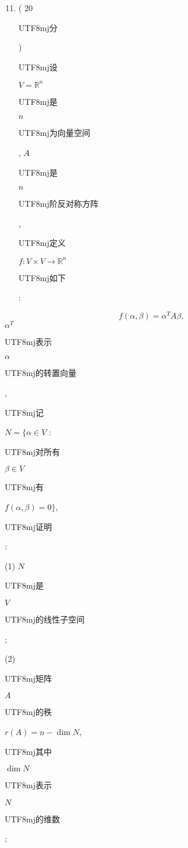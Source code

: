 \documentclass[10pt]{article}
\begin{document}
\begin{enumerate}
  \setcounter{enumi}{10}
  \item ( 20 \begin{CJK}{UTF8}{mj}分\end{CJK}) \begin{CJK}{UTF8}{mj}设\end{CJK} $V=\mathbb{R}^{n}$ \begin{CJK}{UTF8}{mj}是\end{CJK} $n$ \begin{CJK}{UTF8}{mj}为向量空间\end{CJK}, $A$ \begin{CJK}{UTF8}{mj}是\end{CJK} $n$ \begin{CJK}{UTF8}{mj}阶反对称方阵\end{CJK}, \begin{CJK}{UTF8}{mj}定义\end{CJK} $f: V \times V \rightarrow \mathbb{R}^{n}$ \begin{CJK}{UTF8}{mj}如下\end{CJK}:
\end{enumerate}
$$
f(\alpha, \beta)=\alpha^{T} A \beta,
$$
$\alpha^{T}$ \begin{CJK}{UTF8}{mj}表示\end{CJK} $\alpha$ \begin{CJK}{UTF8}{mj}的转置向量\end{CJK}, \begin{CJK}{UTF8}{mj}记\end{CJK} $N=\{\alpha \in V$ : \begin{CJK}{UTF8}{mj}对所有\end{CJK} $\beta \in V$ \begin{CJK}{UTF8}{mj}有\end{CJK} $f(\alpha, \beta)=0\}$, \begin{CJK}{UTF8}{mj}证明\end{CJK}:

(1) $N$ \begin{CJK}{UTF8}{mj}是\end{CJK} $V$ \begin{CJK}{UTF8}{mj}的线性子空间\end{CJK};

(2) \begin{CJK}{UTF8}{mj}矩阵\end{CJK} $A$ \begin{CJK}{UTF8}{mj}的秩\end{CJK} $r(A)=n-\operatorname{dim} N$, \begin{CJK}{UTF8}{mj}其中\end{CJK} $\operatorname{dim} N$ \begin{CJK}{UTF8}{mj}表示\end{CJK} $N$ \begin{CJK}{UTF8}{mj}的维数\end{CJK};
\end{document}
